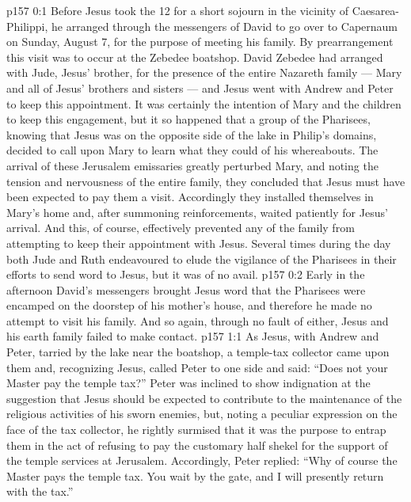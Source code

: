 \author{Midwayer Commission}
\vs p157 0:1 Before Jesus took the 12 for a short sojourn in the vicinity of Caesarea\hyp{}Philippi, he arranged through the messengers of David to go over to Capernaum on Sunday, August 7, for the purpose of meeting his family. By prearrangement this visit was to occur at the Zebedee boatshop. David Zebedee had arranged with Jude, Jesus’ brother, for the presence of the entire Nazareth family --- Mary and all of Jesus’ brothers and sisters --- and Jesus went with Andrew and Peter to keep this appointment. It was certainly the intention of Mary and the children to keep this engagement, but it so happened that a group of the Pharisees, knowing that Jesus was on the opposite side of the lake in Philip’s domains, decided to call upon Mary to learn what they could of his whereabouts. The arrival of these Jerusalem emissaries greatly perturbed Mary, and noting the tension and nervousness of the entire family, they concluded that Jesus must have been expected to pay them a visit. Accordingly they installed themselves in Mary’s home and, after summoning reinforcements, waited patiently for Jesus’ arrival. And this, of course, effectively prevented any of the family from attempting to keep their appointment with Jesus. Several times during the day both Jude and Ruth endeavoured to elude the vigilance of the Pharisees in their efforts to send word to Jesus, but it was of no avail.
\vs p157 0:2 Early in the afternoon David’s messengers brought Jesus word that the Pharisees were encamped on the doorstep of his mother’s house, and therefore he made no attempt to visit his family. And so again, through no fault of either, Jesus and his earth family failed to make contact.
\vs p157 1:1 As Jesus, with Andrew and Peter, tarried by the lake near the boatshop, a temple\hyp{}tax collector came upon them and, recognizing Jesus, called Peter to one side and said: “Does not your Master pay the temple tax?” Peter was inclined to show indignation at the suggestion that Jesus should be expected to contribute to the maintenance of the religious activities of his sworn enemies, but, noting a peculiar expression on the face of the tax collector, he rightly surmised that it was the purpose to entrap them in the act of refusing to pay the customary half shekel for the support of the temple services at Jerusalem. Accordingly, Peter replied: “Why of course the Master pays the temple tax. You wait by the gate, and I will presently return with the tax.”
